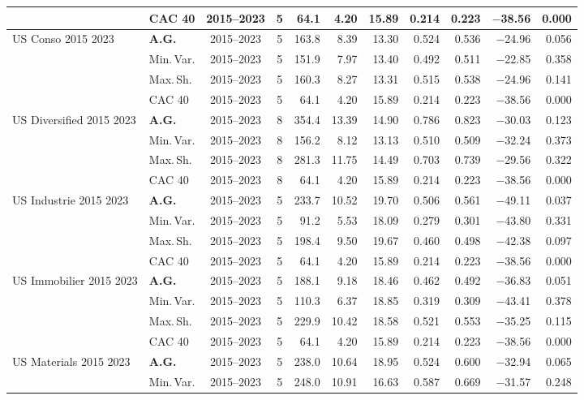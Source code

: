 \begin{longtable}{p{2.6cm} l c c r r r r r r r}
 & CAC 40 & 2015--2023 & 5 & 64.1 & 4.20 & 15.89 & 0.214 & 0.223 & $-$38.56 & 0.000 \\
\midrule
US Conso 2015 2023 & \textbf{A.G.} & 2015--2023 & 5 & 163.8 & 8.39 & 13.30 & 0.524 & 0.536 & $-$24.96 & 0.056 \\
 & Min.\,Var. & 2015--2023 & 5 & 151.9 & 7.97 & 13.40 & 0.492 & 0.511 & $-$22.85 & 0.358 \\
 & Max.\,Sh. & 2015--2023 & 5 & 160.3 & 8.27 & 13.31 & 0.515 & 0.538 & $-$24.96 & 0.141 \\
 & CAC 40 & 2015--2023 & 5 & 64.1 & 4.20 & 15.89 & 0.214 & 0.223 & $-$38.56 & 0.000 \\
\midrule
US Diversified 2015 2023 & \textbf{A.G.} & 2015--2023 & 8 & 354.4 & 13.39 & 14.90 & 0.786 & 0.823 & $-$30.03 & 0.123 \\
 & Min.\,Var. & 2015--2023 & 8 & 156.2 & 8.12 & 13.13 & 0.510 & 0.509 & $-$32.24 & 0.373 \\
 & Max.\,Sh. & 2015--2023 & 8 & 281.3 & 11.75 & 14.49 & 0.703 & 0.739 & $-$29.56 & 0.322 \\
 & CAC 40 & 2015--2023 & 8 & 64.1 & 4.20 & 15.89 & 0.214 & 0.223 & $-$38.56 & 0.000 \\
\midrule
US Industrie 2015 2023 & \textbf{A.G.} & 2015--2023 & 5 & 233.7 & 10.52 & 19.70 & 0.506 & 0.561 & $-$49.11 & 0.037 \\
 & Min.\,Var. & 2015--2023 & 5 & 91.2 & 5.53 & 18.09 & 0.279 & 0.301 & $-$43.80 & 0.331 \\
 & Max.\,Sh. & 2015--2023 & 5 & 198.4 & 9.50 & 19.67 & 0.460 & 0.498 & $-$42.38 & 0.097 \\
 & CAC 40 & 2015--2023 & 5 & 64.1 & 4.20 & 15.89 & 0.214 & 0.223 & $-$38.56 & 0.000 \\
\midrule
US Immobilier 2015 2023 & \textbf{A.G.} & 2015--2023 & 5 & 188.1 & 9.18 & 18.46 & 0.462 & 0.492 & $-$36.83 & 0.051 \\
 & Min.\,Var. & 2015--2023 & 5 & 110.3 & 6.37 & 18.85 & 0.319 & 0.309 & $-$43.41 & 0.378 \\
 & Max.\,Sh. & 2015--2023 & 5 & 229.9 & 10.42 & 18.58 & 0.521 & 0.553 & $-$35.25 & 0.115 \\
 & CAC 40 & 2015--2023 & 5 & 64.1 & 4.20 & 15.89 & 0.214 & 0.223 & $-$38.56 & 0.000 \\
\midrule
US Materials 2015 2023 & \textbf{A.G.} & 2015--2023 & 5 & 238.0 & 10.64 & 18.95 & 0.524 & 0.600 & $-$32.94 & 0.065 \\
 & Min.\,Var. & 2015--2023 & 5 & 248.0 & 10.91 & 16.63 & 0.587 & 0.669 & $-$31.57 & 0.248 \\

\end{longtable}
